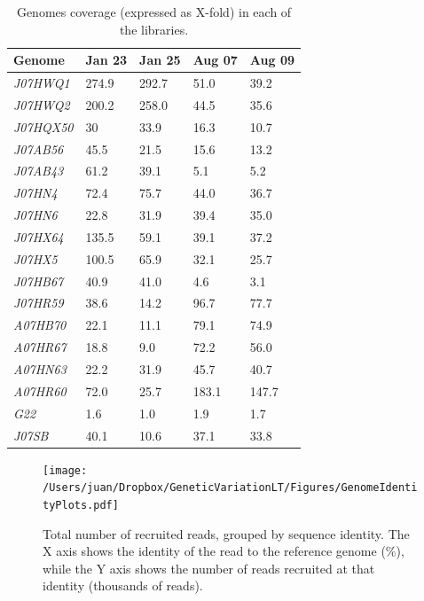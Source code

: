 \begin{table}[ht!]
  \caption{Genomes coverage (expressed as X-fold) in each of the libraries.}
  \begin{tabularx}{\textwidth}{L{2.2cm}R{2cm}R{3cm}R{3.2cm}R{2cm}}
  \hline
    \textbf{Genome} & \textbf{Jan 23} & \textbf{Jan 25} & \textbf{Aug 07} & \textbf{Aug 09} \\
    \hline
     \textit{J07HWQ1} & 274.9 & 292.7 & 51.0 & 39.2 \\
     \textit{J07HWQ2} & 200.2 & 258.0 & 44.5 & 35.6 \\
     \textit{J07HQX50} & 30 & 33.9 & 16.3 & 10.7 \\
     \textit{J07AB56} & 45.5 & 21.5 & 15.6 & 13.2 \\
     \textit{J07AB43} & 61.2 & 39.1 & 5.1 & 5.2 \\
     \textit{J07HN4} & 72.4 & 75.7 & 44.0 & 36.7 \\
     \textit{J07HN6} & 22.8 & 31.9 & 39.4 & 35.0 \\
     \textit{J07HX64} & 135.5 & 59.1 & 39.1 & 37.2 \\
     \textit{J07HX5} & 100.5 & 65.9 & 32.1 & 25.7 \\
     \textit{J07HB67} & 40.9 & 41.0 & 4.6 & 3.1 \\
     \textit{J07HR59} & 38.6 & 14.2 & 96.7 & 77.7 \\
     \textit{A07HB70} & 22.1 & 11.1 & 79.1 & 74.9 \\
     \textit{A07HR67} & 18.8 & 9.0 & 72.2 & 56.0  \\
     \textit{A07HN63} & 22.2 & 31.9 & 45.7 & 40.7 \\
     \textit{A07HR60} & 72.0 & 25.7 & 183.1 & 147.7 \\
     \textit{G22} & 1.6 & 1.0 & 1.9 & 1.7 \\
     \textit{J07SB} & 40.1 & 10.6 & 37.1 & 33.8 \\     
  \end{tabularx}
  \label{ReadCoverageGenome}
\end{table}



\begin{figure}[!hbtp]
  \centering
  \texttt{[image: /Users/juan/Dropbox/GeneticVariationLT/Figures/GenomeIdentityPlots.pdf]}
  \caption{Total number of recruited reads, grouped by sequence identity. The X axis shows the identity of the read to the reference genome (\%), while the Y axis shows the number of reads recruited at that identity (thousands of reads).}
  \label{GenomeReadIdentity}
\end{figure}


